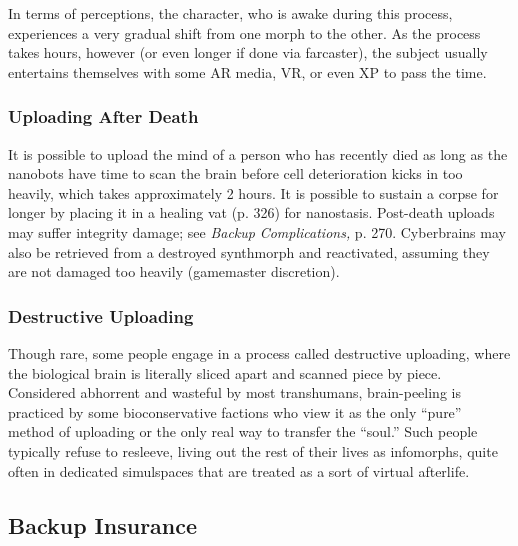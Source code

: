 In terms of perceptions, the character, who is awake during this process, experiences a very gradual shift from one morph to the other. As the process takes hours, however (or even longer if done via farcaster), the subject usually entertains themselves with some AR media, VR, or even XP to pass the time. 

\subsubsection{Uploading After Death} 

It is possible to upload the mind of a person who has recently died as long as the nanobots have time to scan the brain before cell deterioration kicks in too heavily, which takes approximately 2 hours. It is possible to sustain a corpse for longer by placing it in a healing vat (p. 326) for nanostasis. Post-death uploads may suffer integrity damage; see \textit{Backup } \textit{Complications,} p. 270. Cyberbrains may also be retrieved from a destroyed synthmorph and reactivated, assuming they are not damaged too heavily (gamemaster discretion). 

\subsubsection{Destructive Uploading} 

Though rare, some people engage in a process called destructive uploading, where the biological brain is literally sliced apart and scanned piece by piece. Considered abhorrent and wasteful by most transhumans, brain-peeling is practiced by some bioconservative factions who view it as the only ``pure'' method of uploading or the only real way to transfer the ``soul.'' Such people typically refuse to resleeve, living out the rest of their lives as infomorphs, quite often in dedicated simulspaces that are treated as a sort of virtual afterlife. 

\subsection{Backup Insurance} 

